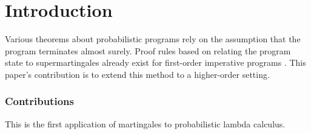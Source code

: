 
\section{Introduction}
\label{sec:intro}

Various theorems about probabilistic programs rely on the assumption that the program terminates almost surely. Proof rules based on relating the program state to supermartingales already exist for first-order imperative programs \citep{DBLP:journals/pacmpl/McIverMKK18}. This paper's contribution is to extend this method to a higher-order setting.

\subsubsection*{Contributions}

This is the first application of martingales to probabilistic lambda calculus.


